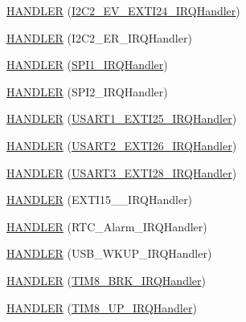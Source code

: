 \begin{DoxyCompactItemize}
\item 
\hyperlink{group___p_i_o_s_ga4ef23887f4ca8f231e4e7d5dac1e6490}{\-H\-A\-N\-D\-L\-E\-R} (\hyperlink{group___sparky_ga860bdffadc546e3969c31b9b00c5d29c}{\-I2\-C2\-\_\-\-E\-V\-\_\-\-E\-X\-T\-I24\-\_\-\-I\-R\-Q\-Handler})
\item 
\hyperlink{group___p_i_o_s_gae93e0ca64a1196614305e8fb0f934cc6}{\-H\-A\-N\-D\-L\-E\-R} (\-I2\-C2\-\_\-\-E\-R\-\_\-\-I\-R\-Q\-Handler)
\item 
\hyperlink{group___p_i_o_s_ga62abd0a75fff43f7a3275a2ced1d32f0}{\-H\-A\-N\-D\-L\-E\-R} (\hyperlink{group___flying_f3_ga9bbd8c17ce4f49adcca47d11f482aab6}{\-S\-P\-I1\-\_\-\-I\-R\-Q\-Handler})
\item 
\hyperlink{group___p_i_o_s_gaacd1f2576272d789637f863ad084d0c5}{\-H\-A\-N\-D\-L\-E\-R} (\-S\-P\-I2\-\_\-\-I\-R\-Q\-Handler)
\item 
\hyperlink{group___p_i_o_s_ga15f854d07581b79a46522cf9462291bc}{\-H\-A\-N\-D\-L\-E\-R} (\hyperlink{group___p_i_o_s___u_s_a_r_t_ga9da740f6a7dda252db44255f54a3bee3}{\-U\-S\-A\-R\-T1\-\_\-\-E\-X\-T\-I25\-\_\-\-I\-R\-Q\-Handler})
\item 
\hyperlink{group___p_i_o_s_ga619c0fe57e74452982f8b139d23c958d}{\-H\-A\-N\-D\-L\-E\-R} (\hyperlink{group___p_i_o_s___u_s_a_r_t_ga4897c2dbb8e8ae70938922276f95800b}{\-U\-S\-A\-R\-T2\-\_\-\-E\-X\-T\-I26\-\_\-\-I\-R\-Q\-Handler})
\item 
\hyperlink{group___p_i_o_s_ga7b00a01c76ff4fe321f382353a91f177}{\-H\-A\-N\-D\-L\-E\-R} (\hyperlink{group___p_i_o_s___u_s_a_r_t_gaab980dd8a502127dc3ae895e77931bdd}{\-U\-S\-A\-R\-T3\-\_\-\-E\-X\-T\-I28\-\_\-\-I\-R\-Q\-Handler})
\item 
\hyperlink{group___p_i_o_s_ga612a35f8a94a6280c13843868268c306}{\-H\-A\-N\-D\-L\-E\-R} (\-E\-X\-T\-I15\-\_\-\_\-\-I\-R\-Q\-Handler)
\item 
\hyperlink{group___p_i_o_s_gae0731c6d70ba277057df059abde85816}{\-H\-A\-N\-D\-L\-E\-R} (\-R\-T\-C\-\_\-\-Alarm\-\_\-\-I\-R\-Q\-Handler)
\item 
\hyperlink{group___p_i_o_s_ga21643f12372d277da96ae9cf6318a197}{\-H\-A\-N\-D\-L\-E\-R} (\-U\-S\-B\-\_\-\-W\-K\-U\-P\-\_\-\-I\-R\-Q\-Handler)
\item 
\hyperlink{group___p_i_o_s_ga73f3c95c6f0c9f0e20976cbfc6107445}{\-H\-A\-N\-D\-L\-E\-R} (\hyperlink{group___p_i_o_s___t_i_m_gaa2754c1d099a614d954b4b449fd5ea19}{\-T\-I\-M8\-\_\-\-B\-R\-K\-\_\-\-I\-R\-Q\-Handler})
\item 
\hyperlink{group___p_i_o_s_ga61af3452715de85c1208b7dc0f371c7c}{\-H\-A\-N\-D\-L\-E\-R} (\hyperlink{group___p_i_o_s___t_i_m_ga255e5267ee3275b665940ed1a61ae3ce}{\-T\-I\-M8\-\_\-\-U\-P\-\_\-\-I\-R\-Q\-Handler})

\end{DoxyCompactItemize}
